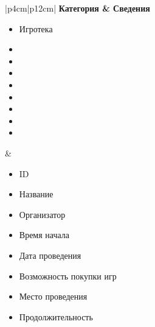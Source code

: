 \clearpage
\begin{table}[h!]
    \begin{center}
    \begin{threeparttable}
        \captionsetup{format=hang,justification=raggedright,
                      singlelinecheck=off}
        \caption{\label{tab:03}Категории данных и сведения о них}
        \renewcommand{\arraystretch}{1.5}
        \begin{tabular}{|p{4cm}|p{12cm}|}
            \hline
            \bfseries Категория & \bfseries Сведения\\
            \hline
            \begin{minipage}[t]{\linewidth}
              \begin{multicols}{1}
                \begin{itemize}[leftmargin=0mm,labelsep=0mm,nosep,after=\strut]
                  \item[] Игротека
                  \item[]
                  \item[]
                  \item[]
                  \item[]
                  \item[]
                  \item[]
                  \item[]
                  \item[]
                \end{itemize}
              \end{multicols}
            \end{minipage}
          & \begin{minipage}[t]{\linewidth}
              \begin{multicols}{2}
                \begin{itemize}[leftmargin=0mm,labelsep=0mm,nosep,after=\strut]
                  \item[] ID
                  \item[] Название
                  \item[] Организатор
                  \item[] Время начала
                  \item[] Дата проведения
                  \item[] Возможность покупки игр
                  \item[] Место проведения
                  \item[] Продолжительность

\end{itemize}
\end{multicols}
\end{minipage}
\end{tabular}
\end{threeparttable}
\end{center}
\end{table}

